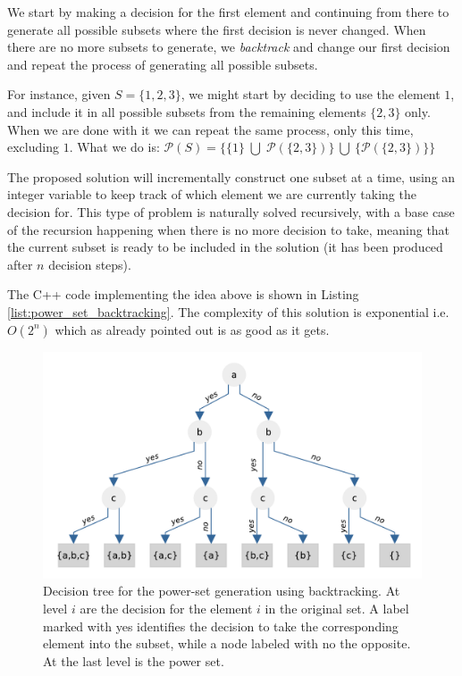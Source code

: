 We start by making a decision for the first element and continuing from there to generate all possible subsets
where the first decision is never changed. 
When there are no more subsets to generate, we \textit{backtrack} and change our first
decision and repeat the process of generating all possible subsets.

For instance, given $S=\{1,2,3\}$, we might start by deciding to use the element $1$, and include it in all possible subsets from the remaining elements $\{2, 3\}$ only. 
When we are done with it we can repeat the same process, only this time, excluding $1$. What we do is: $\mathcal{P}(S)= \{\{1\} \; \bigcup \;\mathcal{P}(\{2,3\})\} \: \bigcup \: \{\mathcal{P}(\{2,3\})\}\} 
$

The proposed solution will incrementally construct one subset at a time, 
using an integer variable to keep track of which element we are currently taking the decision for.
This type of problem is naturally solved recursively, with a base case of the recursion happening when there is no more decision
to take, meaning that the current subset is ready to be included in the solution (it has been
produced after $n$ decision steps).

The C++ code implementing the idea above is shown in Listing \ref{list:power_set_backtracking}. The complexity of this solution is exponential i.e. $O(2^n)$ which as already pointed out is as good as
it gets.





\begin{figure}
    \centering
    \includegraphics[width=\textwidth]{sources/power_set/images/tree}
    \caption[Decision tree for the power-set generation using backtracking.]{Decision tree for the power-set generation using backtracking. At level $i$ are the decision for the element $i$ in the original set. A label marked with yes identifies the decision to take the corresponding element into the subset, while a node labeled with no the opposite. At the last level is the power set.}
    \label{ref:power_set_decision_trees}
\end{figure}

